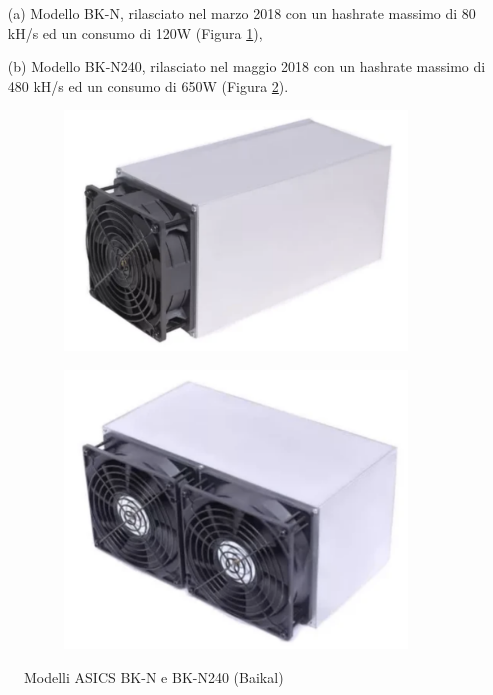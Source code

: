 \begin{itemize}
    \item[(a)] Modello BK-N, rilasciato nel marzo 2018 con un hashrate massimo di 80 kH/s ed un consumo di 120W (Figura \ref{fig:Baikal BK-N}),
    \item[(b)] Modello BK-N240, rilasciato nel maggio 2018 con un hashrate massimo di 480 kH/s ed un consumo di 650W (Figura \ref{fig:Baikal N240}).
\end{itemize}

\begin{figure}[h!]
    \centering
    \begin{subfigure}[b]{0.15\linewidth}
        \includegraphics[width=\linewidth]{images/Baikal BK-N.png}
        \caption{}
        \label{fig:Baikal BK-N}
    \end{subfigure}
    \hspace{1.5cm}
    \begin{subfigure}[b]{0.15\linewidth}
        \includegraphics[width=\linewidth]{images/Baikal N240.png}
        \caption{}
        \label{fig:Baikal N240}
    \end{subfigure}
    \caption{Modelli ASICS BK-N e BK-N240 (Baikal)}
    \label{fig:Baikal miners}
\end{figure}


